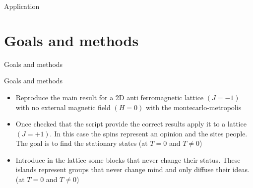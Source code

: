 \documentclass{beamer}
\begin{document}
\begin{frame}{Application \cite{peliti2011statistical}}


\end{frame}


\section{Goals and methods}

\begin{frame}
\begin{center}
{\Huge Goals and methods}
\end{center}
\end{frame}

\begin{frame}{Goals and methods}
\begin{itemize}
\item Reproduce the main result for a 2D anti ferromagnetic lattice $(J=-1)$ with no external magnetic field $(H=0)$ with the montecarlo-metropolis
\item  Once checked that the script provide the correct results apply it to a lattice $(J=+1)$.  In this case the spins represent an opinion and the sites people.  The goal is to find the stationary states (at $T=0$ and $T\neq0$)
\item Introduce in the lattice some blocks that never change their status.  These islands represent groups that never change mind and only diffuse their ideas.  (at $T=0$ and $T\neq0$)
\end{itemize}
\end{frame}
\end{document}
